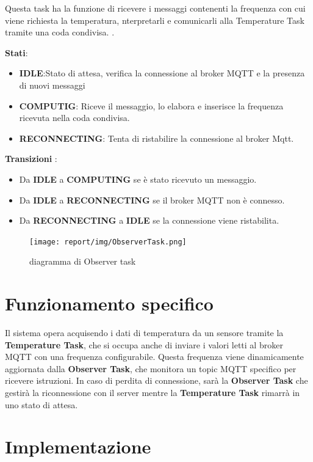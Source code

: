 \documentclass{report}
\begin{document}
\par{
    Questa task ha la funzione di ricevere i messaggi contenenti la frequenza con cui viene richiesta la temperatura, nterpretarli e comunicarli alla Temperature Task tramite una coda condivisa.
    .\newline
}
\par{\textbf{Stati}:}
\begin{itemize}
    \item \textbf{IDLE}:Stato di attesa, verifica la connessione al broker MQTT e la presenza di nuovi messaggi
    \item \textbf{COMPUTIG}: Riceve il messaggio, lo elabora e inserisce la frequenza ricevuta nella coda condivisa.
    \item \textbf{RECONNECTING}: Tenta di ristabilire la connessione al broker Mqtt.
\end{itemize}
\par{
    \textbf{Transizioni} :
}
\begin{itemize}
    \item Da \textbf{IDLE} a \textbf{COMPUTING} se è stato ricevuto un messaggio.
    \item Da \textbf{IDLE} a \textbf{RECONNECTING} se il broker MQTT non è connesso.
    \item Da \textbf{RECONNECTING} a \textbf{IDLE} se la connessione viene ristabilita.
\end{itemize}

\begin{figure}[h]
    \centering
    \texttt{[image: report/img/ObserverTask.png]}
    \caption{diagramma di Observer task}
    \label{fig:stati}
\end{figure}

\section{Funzionamento specifico}
\par{
Il sistema opera acquisendo i dati di temperatura da un sensore tramite la \textbf{Temperature Task}, che si occupa anche di inviare i valori letti al broker MQTT con una frequenza configurabile. Questa frequenza viene dinamicamente aggiornata dalla \textbf{Observer Task}, che monitora un topic MQTT specifico per ricevere istruzioni. In caso di perdita di connessione, sarà la \textbf{Observer Task} che gestirà la riconnessione con il server mentre la \textbf{Temperature Task} rimarrà in uno stato di attesa.
}

\section{Implementazione}
\end{document}

